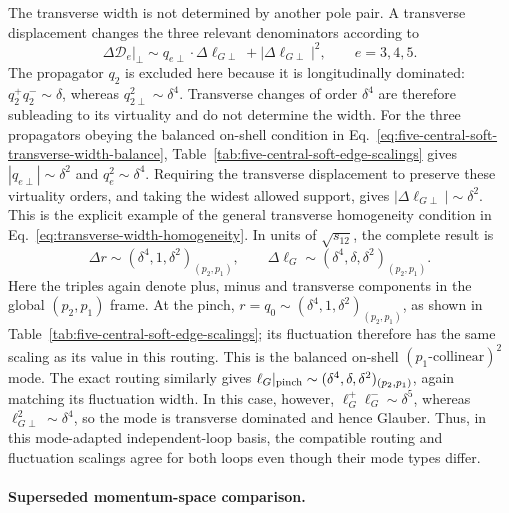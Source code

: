 \documentclass[a4paper,11pt]{article}
\begin{document}
The transverse width is not determined by another pole pair.  A transverse
displacement changes the three relevant
denominators according to
\begin{equation}
 \left.\Delta\mathcal D_e\right|_\perp
 \sim q_{e\perp}\mathbin\cdot\Delta\ell_{G\perp}
      +|\Delta\ell_{G\perp}|^2,
 \qquad e=3,4,5.
 \label{eq:five-central-soft-transverse-width-balance}
\end{equation}
The propagator \(q_2\) is excluded here because it is longitudinally
dominated: \(q_2^+q_2^-\sim\delta\), whereas
\(q_{2\perp}^2\sim\delta^4\).  Transverse changes of order \(\delta^4\)
are therefore subleading to its virtuality and do not determine the width.
For the three propagators obeying the balanced on-shell condition in
Eq.~\eqref{eq:five-central-soft-transverse-width-balance},
Table~\ref{tab:five-central-soft-edge-scalings} gives
\(|q_{e\perp}|\sim\delta^2\) and \(q_e^2\sim\delta^4\).  Requiring the
transverse displacement to preserve these virtuality orders, and taking the
widest allowed support, gives
\(|\Delta\ell_{G\perp}|\sim\delta^2\).  This is the explicit example of the
general transverse homogeneity condition in
Eq.~\eqref{eq:transverse-width-homogeneity}.  In units of
\(\sqrt{s_{12}}\), the complete result is
\begin{equation}
 \Delta r\sim(\delta^4,1,\delta^2)_{(p_2,p_1)},\qquad
 \Delta\ell_G\sim(\delta^4,\delta,\delta^2)_{(p_2,p_1)}.
 \label{eq:five-central-soft-hard-scale-widths}
\end{equation}
Here the triples again denote plus, minus and transverse components in the
global \((p_2,p_1)\) frame.  At the
pinch, \(r=q_0\sim(\delta^4,1,\delta^2)_{(p_2,p_1)}\), as shown in
Table~\ref{tab:five-central-soft-edge-scalings}; its fluctuation therefore has
the same scaling as its value in this routing.  This is the balanced on-shell
\((p_1\text{-collinear})^2\) mode.  The exact routing similarly gives
\(\ell_G\vert_{\rm pinch}\sim
(\delta^4,\delta,\delta^2)_{(p_2,p_1)}\), again matching its
fluctuation width.  In this case, however,
\(\ell_G^+\ell_G^-\sim\delta^5\), whereas
\(\ell_{G\perp}^2\sim\delta^4\), so the mode is transverse dominated and hence
Glauber.  Thus, in this mode-adapted independent-loop basis, the compatible
routing and fluctuation scalings agree for both loops even though their mode
types differ.

\iffalse
\paragraph{Superseded momentum-space comparison.}
\end{document}
